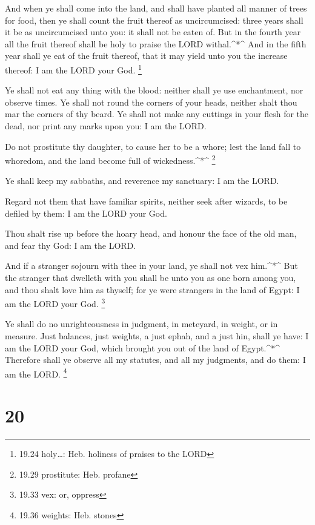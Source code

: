  And when ye shall come into the land, and shall have
planted all manner of trees for food, then ye shall count the fruit
thereof as uncircumcised: three years shall it be as uncircumcised unto
you: it shall not be eaten of.  But in the fourth year all
the fruit thereof shall be holy to praise the LORD withal.\^{}*\^{}
 And in the fifth year shall ye eat of the fruit thereof,
that it may yield unto you the increase thereof: I am the LORD your God.
\footnote{19.24 holy\ldots: Heb. holiness of praises to the LORD}

 Ye shall not eat any thing with the blood: neither shall
ye use enchantment, nor observe times.  Ye shall not round
the corners of your heads, neither shalt thou mar the corners of thy
beard.  Ye shall not make any cuttings in your flesh for
the dead, nor print any marks upon you: I am the LORD.

 Do not prostitute thy daughter, to cause her to be a
whore; lest the land fall to whoredom, and the land become full of
wickedness.\^{}*\^{} \footnote{19.29 prostitute: Heb. profane}

 Ye shall keep my sabbaths, and reverence my sanctuary: I
am the LORD.

 Regard not them that have familiar spirits, neither seek
after wizards, to be defiled by them: I am the LORD your God.

 Thou shalt rise up before the hoary head, and honour the
face of the old man, and fear thy God: I am the LORD.

 And if a stranger sojourn with thee in your land, ye shall
not vex him.\^{}*\^{}  But the stranger that dwelleth with
you shall be unto you as one born among you, and thou shalt love him as
thyself; for ye were strangers in the land of Egypt: I am the LORD your
God. \footnote{19.33 vex: or, oppress}

 Ye shall do no unrighteousness in judgment, in meteyard,
in weight, or in measure.  Just balances, just weights, a
just ephah, and a just hin, shall ye have: I am the LORD your God, which
brought you out of the land of Egypt.\^{}*\^{}  Therefore
shall ye observe all my statutes, and all my judgments, and do them: I
am the LORD. \footnote{19.36 weights: Heb. stones}

\hypertarget{section-19}{%
\section{20}\label{section-19}}


